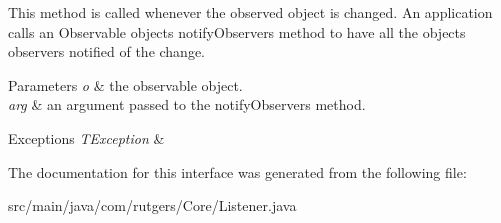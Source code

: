 This method is called whenever the observed object is changed. An application calls an {\ttfamily Observable} object\textquotesingle{}s {\ttfamily notify\+Observers} method to have all the object\textquotesingle{}s observers notified of the change.


\begin{DoxyParams}{Parameters}
{\em o} & the observable object. \\
\hline
{\em arg} & an argument passed to the {\ttfamily notify\+Observers} method. \\
\hline
\end{DoxyParams}

\begin{DoxyExceptions}{Exceptions}
{\em T\+Exception} & \\
\hline
\end{DoxyExceptions}


The documentation for this interface was generated from the following file\+:\begin{DoxyCompactItemize}
\item 
src/main/java/com/rutgers/\+Core/Listener.\+java\end{DoxyCompactItemize}
